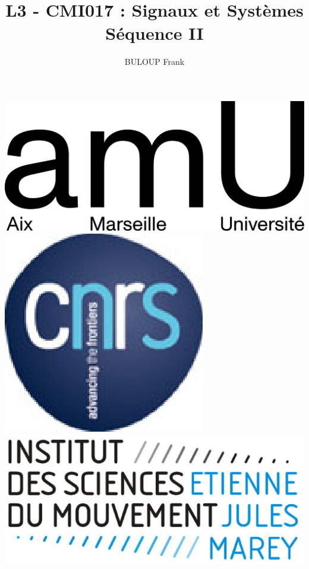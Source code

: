 \documentclass[a4paper,11pt]{beamer}
\title{L3 - CMI017 : Signaux et Systèmes\\Séquence II}
\author{BULOUP Frank}
\institute{Aix Marseille Université\\Institut des Sciences du Mouvement}
\date{}
\begin{document}
\begin{frame}[plain]  
	\titlepage  
	\vspace{1cm}
	
	\includegraphics[scale=0.6]{images/LogoAMU.png}\hspace*{2cm}
	\includegraphics[scale=0.2]{images/LogoCNRS.eps}\hspace*{2cm}
	\includegraphics[scale=0.1]{images/LogoISM.eps}
\end{frame} 
  
\end{document}
